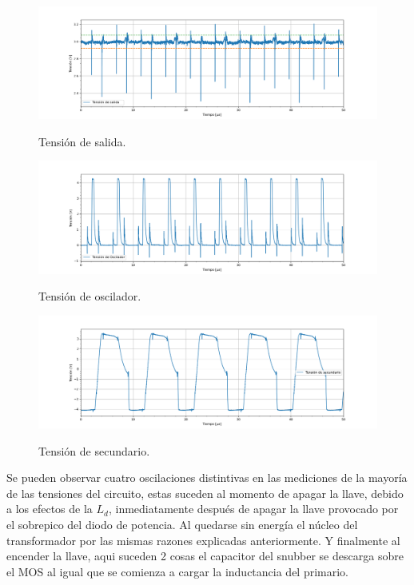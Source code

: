\begin{figure}[H]
	\centering	\includegraphics[width=0.9\linewidth]{ImagenesParteIV/Vout.png}
	\label{fig:vout_4}
	\caption{Tensión de salida.}
\end{figure}

\begin{figure}[H]
	\centering
	\includegraphics[width=0.9\linewidth]{ImagenesParteIV/Vosc.png}
	\label{fig:vosc4}
	\caption{Tensión de oscilador.}
\end{figure}

\begin{figure}[H]
	\centering
	\includegraphics[width=0.9\linewidth]{ImagenesParteIV/Vsec.png}
	\label{fig:vsec_4}
	\caption{Tensión de secundario.}
\end{figure}
Se pueden observar cuatro oscilaciones distintivas en las mediciones de la mayoría de las tensiones del circuito, estas suceden al momento de apagar la llave, debido a los efectos de la $L_d$, inmediatamente después de apagar la llave provocado por el sobrepico del diodo de potencia. Al quedarse sin energía el núcleo del transformador por las mismas razones explicadas anteriormente. Y finalmente al encender la llave, aqui suceden 2 cosas el capacitor del snubber se descarga sobre el MOS al igual que se comienza a cargar la inductancia del primario.
%